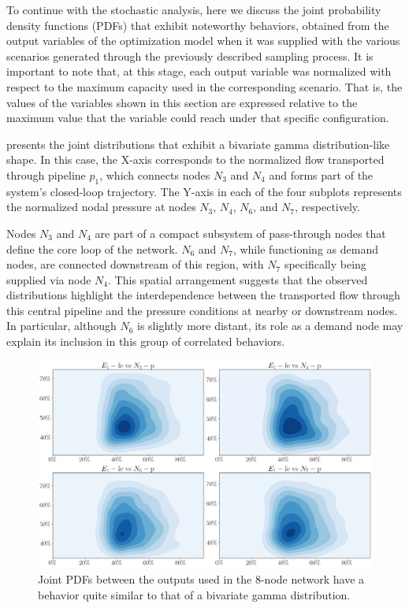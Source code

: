 To continue with the stochastic analysis, here we discuss the joint probability density functions (PDFs) that exhibit noteworthy behaviors, obtained from the output variables of the optimization model when it was supplied with the various scenarios generated through the previously described sampling process. It is important to note that, at this stage, each output variable was normalized with respect to the maximum capacity used in the corresponding scenario. That is, the values of the variables shown in this section are expressed relative to the maximum value that the variable could reach under that specific configuration.



 presents the joint distributions that exhibit a bivariate gamma distribution-like shape. In this case, the X-axis corresponds to the normalized flow transported through pipeline $p_1$, which connects nodes $N_3$ and $N_4$ and forms part of the system’s closed-loop trajectory. The Y-axis in each of the four subplots represents the normalized nodal pressure at nodes $N_3$, $N_4$, $N_6$, and $N_7$, respectively.

Nodes $N_3$ and $N_4$ are part of a compact subsystem of pass-through nodes that define the core loop of the network. $N_6$ and $N_7$, while functioning as demand nodes, are connected downstream of this region, with $N_7$ specifically being supplied via node $N_4$. This spatial arrangement suggests that the observed distributions highlight the interdependence between the transported flow through this central pipeline and the pressure conditions at nearby or downstream nodes. In particular, although $N_6$ is slightly more distant, its role as a demand node may explain its inclusion in this group of correlated behaviors.


\begin{figure}[htbp]
    \begin{center}
        \includegraphics[width=.75\textwidth]{figures/Chapter_NonLinealCensnet/outputs_outputs_1.png}
    \end{center}
    \caption{Joint PDFs between the outputs used in the 8-node network have a behavior quite similar to that of a bivariate gamma distribution.}
    \label{fig:joint_distributions_output_output_1}
\end{figure}




